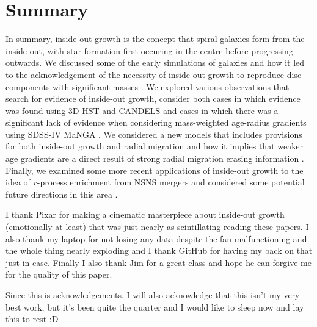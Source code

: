 \documentclass[preprint2]{aastex631}
\begin{document}
\section{Summary}
In summary, inside-out growth is the concept that spiral galaxies form from the inside out, with star formation first occuring in the centre before progressing outwards. We discussed some of the early simulations of galaxies and how it led to the acknowledgement of the necessity of inside-out growth to reproduce disc components with significant masses \citep{Larson+1976}. We explored various observations that search for evidence of inside-out growth, consider both cases in which evidence was found using 3D-HST and CANDELS \citep{vanDokkum+2013} and cases in which there was a significant lack of evidence when considering mass-weighted age-radius gradients using SDSS-IV MaNGA \citep{Goddard+2017}. We considered a new models that includes provisions for both inside-out growth and radial migration and how it implies that weaker age gradients are a direct result of strong radial migration erasing information \citep{Frankel+2019}. Finally, we examined some more recent applications of inside-out growth to the idea of $r$-process enrichment from NSNS mergers and considered some potential future directions in this area \citep{Banerjee+2020}.

\begin{acknowledgements}
    I thank Pixar for making a cinematic masterpiece about inside-out growth (emotionally at least) that was just nearly as scintillating reading these papers. I also thank my laptop for not losing any data despite the fan malfunctioning and the whole thing nearly exploding and I thank GitHub for having my back on that just in case. Finally I also thank Jim for a great class and hope he can forgive me for the quality of this paper.
    
    Since this is acknowledgements, I will also acknowledge that this isn't my very best work, but it's been quite the quarter and I would like to sleep now and lay this to rest :D
\end{acknowledgements}


{}
\end{document}
